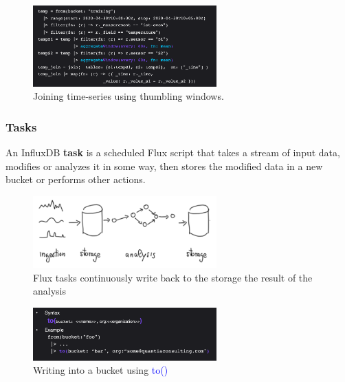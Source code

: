 \documentclass[10pt,a4paper]{article}
\begin{document}
 
  \begin{figure}[ht!]
 \hfill \includegraphics[width=200pt]{images/flux-join-unsync3}
 \hspace*{\fill}
\caption{Joining time-series using thumbling windows.}
 \end{figure} 
 
 \subsubsection{Tasks}
 An InfluxDB \textbf{task} is a scheduled Flux script that takes a stream of input data, modifies or analyzes it in some way, then stores the modified data in a new bucket or performs other actions.
 
 \begin{figure}[ht!]
 \hfill \includegraphics[width=200pt]{images/flux-tasks}
 \hspace*{\fill}
 \caption{Flux tasks continuously write back to the storage the result of the analysis}
 \end{figure} 
 
  \begin{figure}[ht!]
 \hfill \includegraphics[width=200pt]{images/flux-tasks-to}
 \hspace*{\fill}
 \caption{Writing into a bucket using \textcolor{blue}{to()}}
 \end{figure} 
 
 \pagebreak
 
\end{document}
